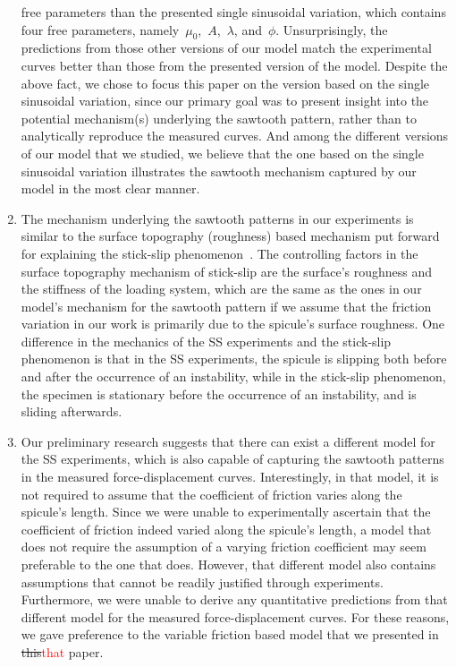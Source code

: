 \documentclass[preprint,10pt,times]{elsarticle}
\numberwithin{equation}{section}
\begin{document}
\begin{enumerate}
free parameters than the presented single sinusoidal variation, which
contains four free parameters, namely~$\mu_0$,~$A$,~$\lambda$,
and~$\phi$. Unsurprisingly, the predictions from those other versions
of our model match the experimental curves better than those from
the presented version of the model. Despite the above fact, we chose
to focus this paper on the version based on the single sinusoidal
variation, since our primary goal was to present insight into the
potential mechanism(s) underlying the sawtooth pattern, rather than
to analytically reproduce the measured curves. And among the different
versions of our model that we studied, we believe that the one based
on the single sinusoidal variation illustrates the sawtooth mechanism
captured by our model in the most clear manner.
\item The mechanism underlying the sawtooth patterns in our experiments
is similar to the surface topography (roughness) based mechanism put
forward for explaining the stick-slip phenomenon~\cite{rabinowicz1966friction,mora1994simulation,berman1996origin}.
The controlling factors in the surface topography mechanism of stick-slip
are the surface's roughness and the stiffness of the loading system,
which are the same as the ones in our model's mechanism for the sawtooth
pattern if we assume that the friction variation in our work is primarily
due to the spicule's surface roughness. One difference in the mechanics
of the SS experiments and the stick-slip phenomenon is that in the
SS experiments, the spicule is slipping both before and after the occurrence
of an instability, while in the stick-slip phenomenon, the specimen
is stationary before the occurrence of an instability, and is sliding
afterwards.
\item Our preliminary research suggests that there can exist a different
model for the SS experiments, which is also capable of capturing the
sawtooth patterns in the measured force-displacement curves. Interestingly,
in that model, it is not required to assume that the coefficient of
friction varies along the spicule's length. Since we were unable to
experimentally ascertain that the coefficient of friction indeed varied
along the spicule's length, a model that does not require the assumption
of a varying friction coefficient may seem preferable to the
one that does. However, that different model also contains assumptions
that cannot be readily justified through experiments. Furthermore,
we were unable to derive any quantitative predictions from that different
model for the measured force-displacement curves. For these reasons,
we gave preference to the variable friction based model that we presented
in \sout{this}\textcolor{red}{that} paper.
\end{enumerate}
\end{document}
